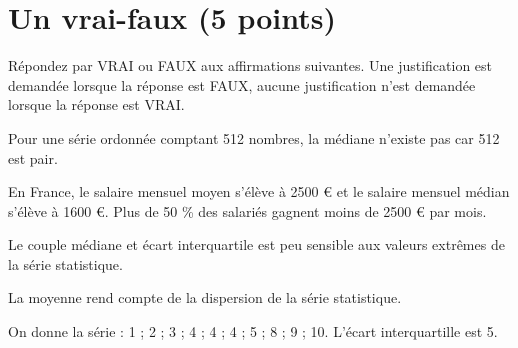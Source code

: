 \section{Un vrai-faux (5 points)}

Répondez par VRAI ou FAUX aux affirmations suivantes. Une justification est demandée lorsque la réponse est FAUX, aucune justification n'est demandée lorsque la réponse est VRAI.

\begin{questions}
	\question[1] Pour une série ordonnée comptant 512 nombres, la médiane n'existe pas car 512 est pair.
	
	\question[1] En France, le salaire mensuel moyen s'élève à \num{2500} € et le salaire mensuel médian s'élève à \num{1600} €. Plus de 50 \% des salariés gagnent moins de \num{2500} € par mois.
	
	\question[1] Le couple médiane et écart interquartile est peu sensible aux valeurs extrêmes de la série statistique.
	
	\question[1] La moyenne rend compte de la dispersion de la série statistique.
	
	
	\question[1] On donne la série : 1 ; 2 ; 3 ; 4 ; 4 ; 4 ; 5 ; 8 ; 9 ; 10. L'écart interquartille est 5.
\end{questions}